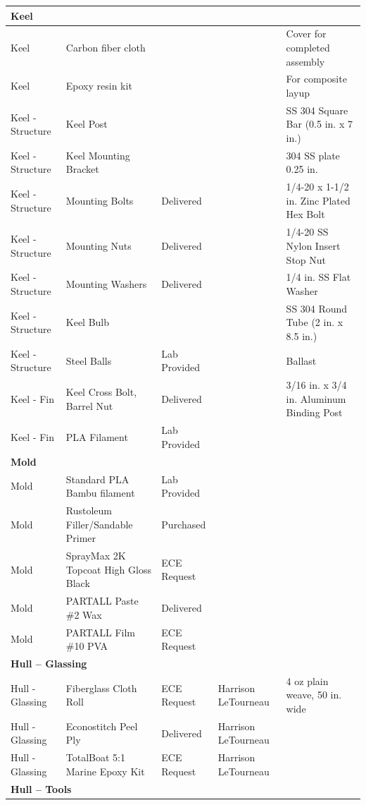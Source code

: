 \begin{table}[htbp]
\begin{tabular}{|p{2.2cm}|p{5.5cm}|p{2.2cm}|p{2.5cm}|p{3.5cm}|}
\multicolumn{5}{|l|}{\textbf{Keel}} \\
\hline
Keel & Carbon fiber cloth & & & Cover for completed assembly \\
\hline
Keel & Epoxy resin kit & & & For composite layup \\
\hline
Keel - Structure & Keel Post & & & SS 304 Square Bar (0.5 in. x 7 in.) \\
\hline
Keel - Structure & Keel Mounting Bracket & & & 304 SS plate 0.25 in. \\
\hline
Keel - Structure & Mounting Bolts & Delivered & & 1/4-20 x 1-1/2 in. Zinc Plated Hex Bolt \\
\hline
Keel - Structure & Mounting Nuts & Delivered & & 1/4-20 SS Nylon Insert Stop Nut \\
\hline
Keel - Structure & Mounting Washers & Delivered & & 1/4 in. SS Flat Washer \\
\hline
Keel - Structure & Keel Bulb & & & SS 304 Round Tube (2 in. x 8.5 in.) \\
\hline
Keel - Structure & Steel Balls & Lab Provided & & Ballast \\
\hline
Keel - Fin & Keel Cross Bolt, Barrel Nut & Delivered & & 3/16 in. x 3/4 in. Aluminum Binding Post \\
\hline
Keel - Fin & PLA Filament & Lab Provided & & \\
\hline
\multicolumn{5}{|l|}{\textbf{Mold}} \\
\hline
Mold & Standard PLA Bambu filament & Lab Provided & & \\
\hline
Mold & Rustoleum Filler/Sandable Primer & Purchased & & \\
\hline
Mold & SprayMax 2K Topcoat High Gloss Black & ECE Request & & \\
\hline
Mold & PARTALL Paste \#2 Wax & Delivered & & \\
\hline
Mold & PARTALL Film \#10 PVA & ECE Request & & \\
\hline
\multicolumn{5}{|l|}{\textbf{Hull -- Glassing}} \\
\hline
Hull - Glassing & Fiberglass Cloth Roll & ECE Request & Harrison LeTourneau & 4 oz plain weave, 50 in. wide \\
\hline
Hull - Glassing & Econostitch Peel Ply & Delivered & Harrison LeTourneau & \\
\hline
Hull - Glassing & TotalBoat 5:1 Marine Epoxy Kit & ECE Request & Harrison LeTourneau & \\
\hline
\multicolumn{5}{|l|}{\textbf{Hull -- Tools}} \\

\end{tabular}
\end{table}
